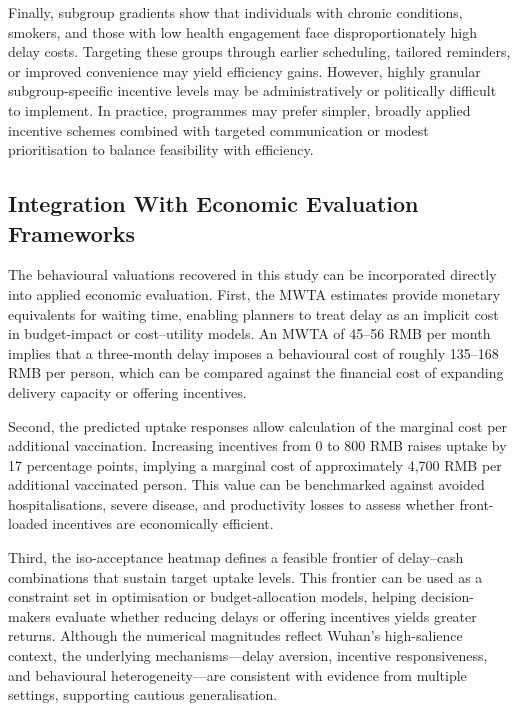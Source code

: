 \documentclass[12pt]{article}
\begin{document}
Finally, subgroup gradients show that individuals with chronic conditions, smokers, and those with low health engagement face disproportionately high delay costs. Targeting these groups through earlier scheduling, tailored reminders, or improved convenience may yield efficiency gains. However, highly granular subgroup-specific incentive levels may be administratively or politically difficult to implement. In practice, programmes may prefer simpler, broadly applied incentive schemes combined with targeted communication or modest prioritisation to balance feasibility with efficiency.



\subsection{Integration With Economic Evaluation Frameworks}
The behavioural valuations recovered in this study can be incorporated directly into applied economic evaluation. First, the MWTA estimates provide monetary equivalents for waiting time, enabling planners to treat delay as an implicit cost in budget‐impact or cost–utility models. An MWTA of 45–56 RMB per month implies that a three-month delay imposes a behavioural cost of roughly 135–168 RMB per person, which can be compared against the financial cost of expanding delivery capacity or offering incentives.

Second, the predicted uptake responses allow calculation of the marginal cost per additional vaccination. Increasing incentives from 0 to 800 RMB raises uptake by 17 percentage points, implying a marginal cost of approximately 4,700 RMB per additional vaccinated person. This value can be benchmarked against avoided hospitalisations, severe disease, and productivity losses to assess whether front-loaded incentives are economically efficient.

Third, the iso-acceptance heatmap defines a feasible frontier of delay–cash combinations that sustain target uptake levels. This frontier can be used as a constraint set in optimisation or budget‐allocation models, helping decision-makers evaluate whether reducing delays or offering incentives yields greater returns. Although the numerical magnitudes reflect Wuhan’s high-salience context, the underlying mechanisms—delay aversion, incentive responsiveness, and behavioural heterogeneity—are consistent with evidence from multiple settings, supporting cautious generalisation.
\end{document}
